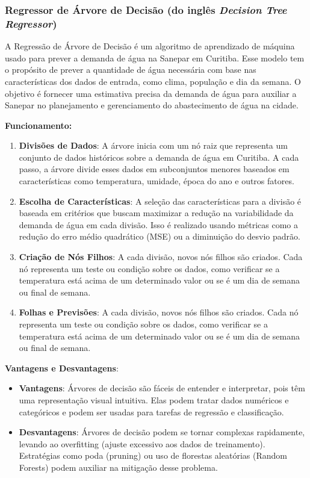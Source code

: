 \subsubsection{Regressor de \'Arvore de Decis\~ao (do ingl\^es \textit{Decision Tree Regressor})}



A Regressão de Árvore de Decisão é um algoritmo de aprendizado de máquina usado para prever a demanda de água na Sanepar em Curitiba. Esse modelo tem o propósito de prever a quantidade de água necessária com base nas características dos dados de entrada, como clima, população e dia da semana. O objetivo é fornecer uma estimativa precisa da demanda de água para auxiliar a Sanepar no planejamento e gerenciamento do abastecimento de água na cidade.

\textbf{Funcionamento:}

\begin{enumerate}
	\item \textbf{Divisões de Dados}: A árvore inicia com um nó raiz que representa um conjunto de dados históricos sobre a demanda de água em Curitiba. A cada passo, a árvore divide esses dados em subconjuntos menores baseados em características como temperatura, umidade, época do ano e outros fatores.

	\item \textbf{Escolha de Características}: A seleção das características para a divisão é baseada em critérios que buscam maximizar a redução na variabilidade da demanda de água em cada divisão. Isso é realizado usando métricas como a redução do erro médio quadrático (MSE) ou a diminuição do desvio padrão.

	\item \textbf{Criação de Nós Filhos}: A cada divisão, novos nós filhos são criados. Cada nó representa um teste ou condição sobre os dados, como verificar se a temperatura está acima de um determinado valor ou se é um dia de semana ou final de semana.

	\item \textbf{Folhas e Previsões}: A cada divisão, novos nós filhos são criados. Cada nó representa um teste ou condição sobre os dados, como verificar se a temperatura está acima de um determinado valor ou se é um dia de semana ou final de semana.
\end{enumerate}

\textbf{Vantagens e Desvantagens}:

\begin{itemize}
	\item \textbf{Vantagens}: Árvores de decisão são fáceis de entender e interpretar, pois têm uma representação visual intuitiva. Elas podem tratar dados numéricos e categóricos e podem ser usadas para tarefas de regressão e classificação.

	\item \textbf{Desvantagens}: Árvores de decisão podem se tornar complexas rapidamente, levando ao overfitting (ajuste excessivo aos dados de treinamento). Estratégias como poda (pruning) ou uso de florestas aleatórias (Random Forests) podem auxiliar na mitigação desse problema.
\end{itemize}

